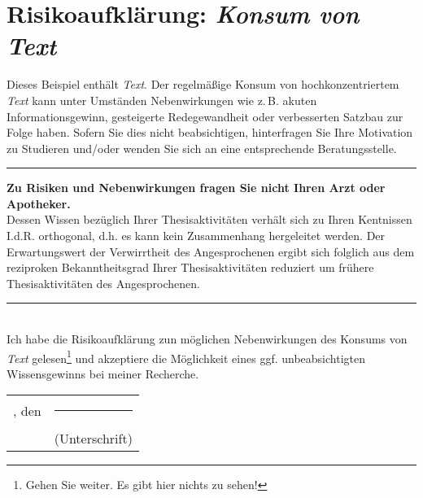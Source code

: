 
%
%	
	\section*{Risikoaufklärung: \textit{Konsum von Text}} %
	
	Dieses Beispiel enthält \emph{Text}. Der regelmäßige Konsum von hochkonzentriertem \emph{Text} kann unter Umständen Nebenwirkungen wie z.\,B. akuten Informationsgewinn, gesteigerte Redegewandheit oder verbesserten Satzbau zur Folge haben. Sofern Sie dies nicht beabsichtigen, hinterfragen Sie Ihre Motivation zu Studieren und/oder wenden Sie sich an eine entsprechende Beratungsstelle.
	\\
	
	
	{%
		\hrule
		\vspace{0.2em}
		\footnotesize%
		\sffamily%
		\noindent
		\textbf{Zu Risiken und Nebenwirkungen fragen Sie nicht Ihren Arzt oder Apotheker.}\\Dessen Wissen bezüglich Ihrer Thesisaktivitäten verhält sich zu Ihren Kentnissen I.d.R. orthogonal, d.h. es kann kein Zusammenhang hergeleitet werden. Der Erwartungswert der Verwirrtheit des Angesprochenen ergibt sich folglich aus dem reziproken Bekanntheitsgrad Ihrer Thesisaktivitäten reduziert um frühere Thesisaktivitäten des Angesprochenen.
		\hrule
	}~
	\\
	
	\noindent
	Ich habe die Risikoaufklärung zun möglichen Nebenwirkungen des Konsums von \emph{Text} gelesen\footnote{Gehen Sie weiter. Es gibt hier nichts zu sehen!} und akzeptiere die Möglichkeit eines ggf. unbeabsichtigten Wissensgewinns bei meiner Recherche.
	
	
	\vfill
	\begin{tabular}{l c}
		\ort, den \abgabedatum \hspace*{1cm}& \rule[-2px]{5cm}{0.5px} \\ 
		&\footnotesize{(Unterschrift)}
	\end{tabular}

